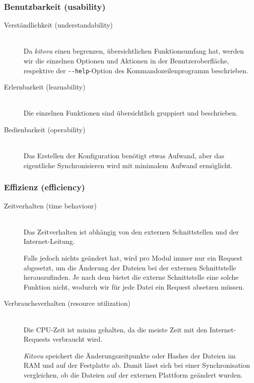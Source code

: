 \documentclass[a4paper]{article}
\begin{document}
\subsubsection{Benutzbarkeit (usability)}

\begin{description}
  \item[Verständlichkeit (understandability)] \strut \\
    Da \emph{kitovu} einen begrenzen, übersichtlichen Funktionsumfang hat, werden wir die einzelnen Optionen und Aktionen in der Benutzeroberfläche, respektive der \verb|--help|-Option des Kommandozeilenprogramm beschrieben.
  \item[Erlernbarkeit (learnability)] \strut \\
    Die einzelnen Funktionen sind übersichtlich gruppiert und beschrieben.
  \item[Bedienbarkeit (operability)] \strut \\
    Das Erstellen der Konfiguration benötigt etwas Aufwand, aber das eigentliche Synchronisieren wird mit minimalem Aufwand ermöglicht.
\end{description}

\subsubsection{Effizienz (efficiency)}

\begin{description}
  \item[Zeitverhalten (time behaviour)] \strut \\
    Das Zeitverhalten ist abhängig von den externen Schnittstellen und der Internet-Leitung.

    Falls jedoch nichts geändert hat, wird pro Modul immer nur ein Request abgesetzt, um die Änderung der Dateien bei der externen Schnittstelle herauszufinden.
    Je nach dem bietet die externe Schnittstelle eine solche Funktion nicht, wodurch wir für jede Datei ein Request absetzen müssen.
  \item[Verbrauchsverhalten (resource utilization)] \strut \\
    Die CPU-Zeit ist minim gehalten, da die meiste Zeit mit den Internet-Requests verbraucht wird.

    \emph{Kitovu} speichert die Änderungszeitpunkte oder Hashes der Dateien im RAM und auf der Festplatte ab. Damit lässt sich bei einer Synchronisation vergleichen, ob die Dateien auf der externen Plattform geändert wurden.
\end{description}
\end{document}

